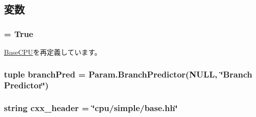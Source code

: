 \subsection{変数}
\hypertarget{classBaseSimpleCPU_1_1BaseSimpleCPU_a17fa61ac3806b481cafee5593b55e5d0}{
\subsubsection[{abstract}]{ = True}}
\label{classBaseSimpleCPU_1_1BaseSimpleCPU_a17fa61ac3806b481cafee5593b55e5d0}


\hyperlink{classBaseCPU_1_1BaseCPU_a17fa61ac3806b481cafee5593b55e5d0}{BaseCPU}を再定義しています。\hypertarget{classBaseSimpleCPU_1_1BaseSimpleCPU_ac566dd90d96e45183abc6f54c960ffec}{
\subsubsection[{branchPred}]{\setlength{\rightskip}{0pt plus 5cm}tuple {\bf branchPred} = Param.BranchPredictor(NULL, \char`\"{}Branch Predictor\char`\"{})}}
\label{classBaseSimpleCPU_1_1BaseSimpleCPU_ac566dd90d96e45183abc6f54c960ffec}
\hypertarget{classBaseSimpleCPU_1_1BaseSimpleCPU_ad4f09c6c6f92935f2d917a5b0ba77cb0}{
\subsubsection[{checker}]{}}
\label{classBaseSimpleCPU_1_1BaseSimpleCPU_ad4f09c6c6f92935f2d917a5b0ba77cb0}
\hypertarget{classBaseSimpleCPU_1_1BaseSimpleCPU_a17da7064bc5c518791f0c891eff05fda}{
\subsubsection[{cxx\_\-header}]{\setlength{\rightskip}{0pt plus 5cm}string {\bf cxx\_\-header} = \char`\"{}cpu/simple/base.hh\char`\"{}}}
\label{classBaseSimpleCPU_1_1BaseSimpleCPU_a17da7064bc5c518791f0c891eff05fda}


